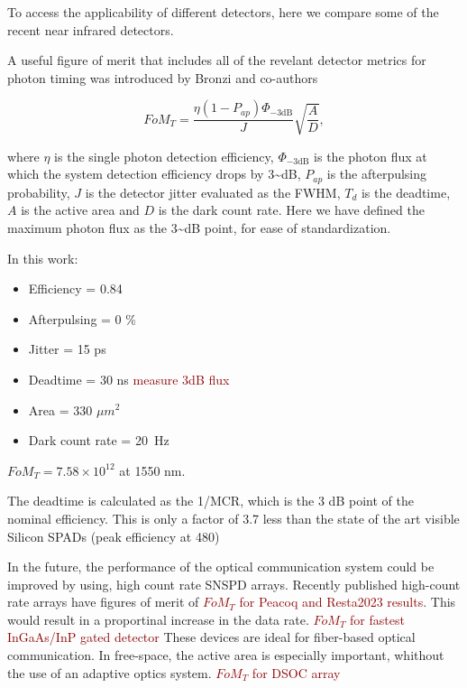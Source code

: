 \documentclass[11pt]{caltech_thesis} %
\begin{document}
To access the applicability of different detectors, here we compare some
of the recent near infrared detectors.

A useful figure of merit that includes all of the revelant detector
metrics for photon timing was introduced by Bronzi and co-authors
\autocite{Bronzi2016}

\[FoM_T = \frac{\eta  (1 - P_{ap})\Phi_{-3 \text{dB}}}{J} \sqrt{\frac{A}{D}},\]

where \(\eta\) is the single photon detection efficiency,
\(\Phi_{-3 \text{dB}}\) is the photon flux at which the system detection
efficiency drops by 3\textasciitilde dB, \(P_{ap}\) is the afterpulsing
probability, \(J\) is the detector jitter evaluated as the FWHM, \(T_d\)
is the deadtime, \(A\) is the active area and \(D\) is the dark count
rate. Here we have defined the maximum photon flux as the
3\textasciitilde dB point, for ease of standardization.

In this work:

\begin{itemize}
\tightlist
\item
  Efficiency = 0.84
\item
  Afterpulsing = 0 \%
\item
  Jitter = 15 ps
\item
  Deadtime = 30 ns \textcolor{darkred}{measure 3dB flux}
\item
  Area = 330 \(\mu m^2\)
\item
  Dark count rate = 20~Hz
\end{itemize}

\(FoM_T = 7.58 \times 10^{12}\) at 1550 nm.

The deadtime is calculated as the 1/MCR, which is the 3 dB point of the
nominal efficiency. This is only a factor of 3.7 less than the state of
the art visible Silicon SPADs (peak efficiency at 480\nm)
\autocite{Gramuglia2022}

In the future, the performance of the optical communication system could
be improved by using, high count rate SNSPD arrays. Recently published
high-count rate arrays have figures of merit of
\textcolor{darkred}{\(FoM_T\) for Peacoq and Resta2023 results}. This
would result in a proportinal increase in the data rate.
\textcolor{darkred}{\(FoM_T\) for fastest InGaAs/InP gated detector}
These devices are ideal for fiber-based optical communication. In
free-space, the active area is especially important, whithout the use of
an adaptive optics system. \textcolor{darkred}{\(FoM_T\) for DSOC array}
\end{document}
